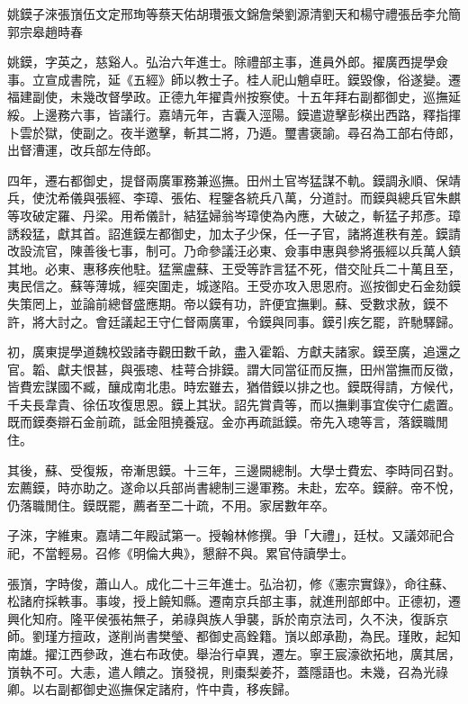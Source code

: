 
\begin{pinyinscope}
姚鏌子淶張嵿伍文定邢珣等蔡天佑胡瓚張文錦詹榮劉源清劉天和楊守禮張岳李允簡郭宗皋趙時春

姚鏌，字英之，慈谿人。弘治六年進士。除禮部主事，進員外郎。擢廣西提學僉事。立宣成書院，延《五經》師以教士子。桂人祀山魈卓旺。鏌毀像，俗遂變。遷福建副使，未幾改督學政。正德九年擢貴州按察使。十五年拜右副都御史，巡撫延綏。上邊務六事，皆議行。嘉靖元年，吉囊入涇陽。鏌遣遊擊彭楧出西路，釋指揮卜雲於獄，使副之。夜半邀擊，斬其二將，乃遁。璽書褒諭。尋召為工部右侍郎，出督漕運，改兵部左侍郎。

四年，遷右都御史，提督兩廣軍務兼巡撫。田州土官岑猛謀不軌。鏌調永順、保靖兵，使沈希儀與張經、李璋、張佑、程鑒各統兵八萬，分道討。而鏌與總兵官朱麒等攻破定羅、丹梁。用希儀計，結猛婦翁岑璋使為內應，大破之，斬猛子邦彥。璋誘殺猛，獻其首。詔進鏌左都御史，加太子少保，任一子官，諸將進秩有差。鏌請改設流官，陳善後七事，制可。乃命參議汪必東、僉事申惠與參將張經以兵萬人鎮其地。必東、惠移疾他駐。猛黨盧蘇、王受等詐言猛不死，借交阯兵二十萬且至，夷民信之。蘇等薄城，經突圍走，城遂陷。王受亦攻入思恩府。巡按御史石金劾鏌失策罔上，並論前總督盛應期。帝以鏌有功，許便宜撫剿。蘇、受數求赦，鏌不許，將大討之。會廷議起王守仁督兩廣軍，令鏌與同事。鏌引疾乞罷，許馳驛歸。

初，廣東提學道魏校毀諸寺觀田數千畝，盡入霍韜、方獻夫諸家。鏌至廣，追還之官。韜、獻夫恨甚，與張璁、桂萼合排鏌。謂大同當征而反撫，田州當撫而反徵，皆費宏謀國不臧，釀成南北患。時宏雖去，猶借鏌以排之也。鏌既得請，方候代，千夫長韋貴、徐伍攻復思恩。鏌上其狀。詔先賞貴等，而以撫剿事宜俟守仁處置。既而鏌奏辯石金前疏，詆金阻撓養寇。金亦再疏詆鏌。帝先入璁等言，落鏌職閒住。

其後，蘇、受復叛，帝漸思鏌。十三年，三邊闕總制。大學士費宏、李時同召對。宏薦鏌，時亦助之。遂命以兵部尚書總制三邊軍務。未赴，宏卒。鏌辭。帝不悅，仍落職閒住。鏌既罷，薦者至二十疏，不用。家居數年卒。

子淶，字維東。嘉靖二年殿試第一。授翰林修撰。爭「大禮」，廷杖。又議郊祀合祀，不當輕易。召修《明倫大典》，懇辭不與。累官侍讀學士。

張嵿，字時俊，蕭山人。成化二十三年進士。弘治初，修《憲宗實錄》，命往蘇、松諸府採軼事。事竣，授上饒知縣。遷南京兵部主事，就進刑部郎中。正德初，遷興化知府。隆平侯張祐無子，弟祿與族人爭襲，訴於南京法司，久不決，復訴京師。劉瑾方擅政，遂削尚書樊瑩、都御史高銓籍。嵿以郎承勘，為民。瑾敗，起知南雄。擢江西參政，進右布政使。舉治行卓異，遷左。寧王宸濠欲拓地，廣其居，嵿執不可。大恚，遣人饋之。嵿發視，則棗梨姜芥，蓋隱語也。未幾，召為光祿卿。以右副都御史巡撫保定諸府，忤中貴，移疾歸。


\end{pinyinscope}
